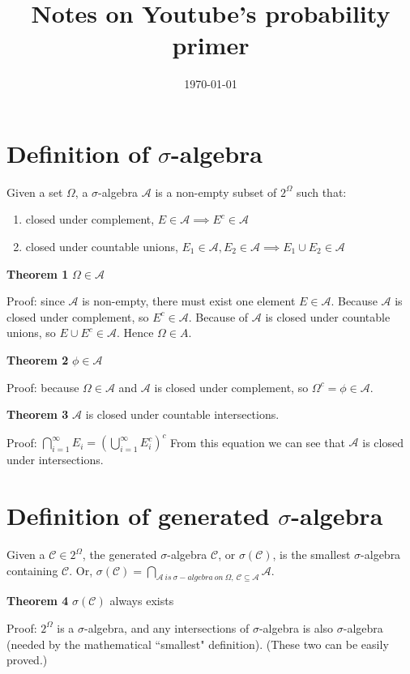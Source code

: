\documentclass[12pt]{article}
\title{Notes on Youtube's probability primer}
\date{\today}
\newcommand{\A}{\mathcal{A}}
\newcommand{\C}{\mathcal{C}}
\begin{document}
\maketitle

\section{Definition of $\sigma$-algebra}

Given a set $\Omega$, a $\sigma$-algebra $\A$ is a non-empty subset of $2^\Omega$ such that:

\begin{enumerate}
    \item closed under complement, $E\in \A \implies E^c \in \A$ 

    \item closed under countable unions, $E_1\in \A, E_2\in \A \implies E_1\cup E_2\in \A$
\end{enumerate}

\bigbreak

\textbf{Theorem 1} $\Omega\in \A$

Proof: since $\A$ is non-empty, there must exist one element $E\in \A$. Because $\A$ is closed
under complement, so $E^c\in \A$. Because of $\A$ is closed under countable unions, so
$E \cup E^c \in \A$. Hence $\Omega\in A$.
\bigbreak

\textbf{Theorem 2} $\phi \in \A$

Proof: because $\Omega \in \A$ and $\A$ is closed under complement, so $\Omega^c=\phi\in \A$.
\bigbreak

\textbf{Theorem 3} $\A$ is closed under countable intersections.

Proof: $\bigcap\limits_{i=1}^{\infty} E_i = (\bigcup\limits_{i=1}^{\infty} E_i^c)^c$
From this equation we can see that $\A$ is closed under intersections.

\section{Definition of generated $\sigma$-algebra}

Given a $\C\in 2^\Omega$, the generated $\sigma$-algebra $\C$, or $\sigma(\C)$, is the smallest
$\sigma$-algebra containing $\C$.
Or, $\sigma(\C)=\bigcap\limits_{\A\ is\ \sigma-algebra\ on\ \Omega,\ \C\subseteq \A} \A$.
\bigbreak

\textbf{Theorem 4} $\sigma(\C)$ always exists

Proof: $2^\Omega$ is a $\sigma$-algebra, and any intersections of $\sigma$-algebra is also
$\sigma$-algebra (needed by the mathematical ``smallest" definition). (These two can be easily proved.)
\bigbreak
\end{document}
